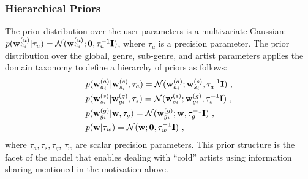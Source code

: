 \subsubsection{Hierarchical Priors}
The prior distribution over the user parameters is a multivariate Gaussian:
$p(\mathbf{w}^{(u)}_{u_i} | \tau_u) = \mathcal{N}(\mathbf{w}^{(u)}_{u_i} ; \mathbf{0}, \tau_u^{-1}\mathbf{I} )$, where $\tau_u$ is a precision parameter.
The prior distribution over the global, genre, sub-genre, and artist parameters applies the domain taxonomy to define a hierarchy of priors as follows:
\begin{align}
&p(\mathbf{w}^{(a)}_{a_i} | \mathbf{w}^{(s)}_{s_i}, \tau_a )  = \mathcal{N} (\mathbf{w}^{(a)}_{a_i}; \mathbf{w}^{(s)}_{s_i}, \tau_a^{-1}\mathbf{I} ) \ , \nonumber \\
&p(\mathbf{w}^{(s)}_{s_i} | \mathbf{w}^{(g)}_{g_i}, \tau_s)   = \mathcal{N} (\mathbf{w}^{(s)}_{s_i}; \mathbf{w}^{(g)}_{g_i}, \tau_s^{-1}\mathbf{I} ) \ , \nonumber \\
&p(\mathbf{w}^{(g)}_{g_i} | \mathbf{w}, \tau_g )              = \mathcal{N} (\mathbf{w}^{(g)}_{g_i}; \mathbf{w}, \tau_g^{-1}\mathbf{I} )             \ , \nonumber \\
&p(\mathbf{w} | \tau_w)                               = \mathcal{N} (\mathbf{w}; \mathbf{0}, \tau_w^{-1}\mathbf{I} ) \ ,
\end{align}
where $\tau_a, \tau_s, \tau_g$, $\tau_w$ are scalar precision parameters.
This prior structure is the facet of the model that enables dealing with ``cold'' artists using information sharing mentioned in the motivation above.
